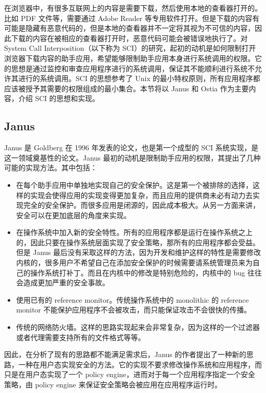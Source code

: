 在浏览器中，有很多互联网上的内容是需要下载，然后使用本地的查看器打开的。比如 PDF 文件等，需要通过 Adobe Reader 等专用软件打开。但是下载的内容有可能是隐藏有恶意代码的，但是本地的查看器并不一定将其视为不可信的内容，因此下载的内容在被相应的查看器打开时，恶意代码可能会被错误地执行了。对 System Call Interposition（以下称为 SCI）的研究，起初的动机是如何限制打开浏览器下载内容的助手应用，希望能够限制助手应用本身进行系统调用的权限。它的思想是通过监控和审查应用程序进行的系统调用，保证其不能顺利进行系统不允许其进行的系统调用。SCI 的思想参考了 Unix 的最小特权原则，所有应用程序都应该被授予其需要的权限组成的最小集合。本节将以 Janus 和 Ostia 作为主要内容，介绍 SCI 的思想和实现。

\subsection{Janus}
\label{sss:janus}

Janus \parencite{goldberg} 是 Goldberg 在 1996 年发表的论文，也是第一个成型的 SCI 系统实现，是这一领域奠基性的论文。Janus 最初的动机是限制助手应用的权限，其提出了几种可能的实现方法。其中包括：

\begin{itemize}
\item
在每个助手应用中单独地实现自己的安全保护。这是第一个被排除的选择，这样的实现会使得应用的实现变得更加复杂，而且应用的提供商未必有动力去实现完全的安全保护。而很多应用是闭源的，因此成本极大。从另一方面来讲，安全可以在更加底层的角度来实现。
\item
在操作系统中加入新的安全特性。所有的应用程序都是运行在操作系统之上的，因此只要在操作系统层面实现了安全策略，那所有的应用程序都会受益。但是 Janus 最后没有采取这样的方法，因为开发和维护这样的特性是需要修改内核的，很多用户不希望自己在添加安全保护的时候需要请系统管理员来为自己的操作系统打补丁。而且在内核中的修改是特别危险的，内核中的 bug 往往会造成更加严重的安全事故。
\item
使用已有的 reference monitor。传统操作系统中的 monolithic 的 reference monitor 不能保护应用程序不会被攻击，而只能保证攻击不会很快的传播。
\item
传统的网络防火墙。这样的思路实现起来会非常复杂，因为这样的一个过滤器或者代理需要支持所有的文件格式等等。
\end{itemize}

因此，在分析了现有的思路都不能满足需求后，Janus 的作者提出了一种新的思路，一种在用户态实现安全的方法。它的实现不要求修改操作系统和应用程序，而只是在用户态实现了一个 policy engine，进而对于每一个应用程序指定一个安全策略，由 policy engine 来保证安全策略会被应用在应用程序运行时。

